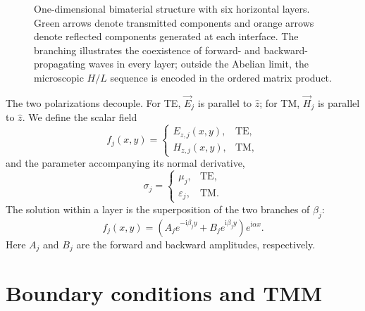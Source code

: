 \documentclass[10pt,a4paper]{article}
\newcommand{\ii}{\mathrm{i}}
\newcommand{\vE}{\vec{E}}
\newcommand{\vH}{\vec{H}}
\begin{document}
\begin{figure}[t]
\caption{One-dimensional bimaterial structure with six horizontal layers. Green arrows denote transmitted components and orange arrows denote reflected components generated at each interface. The branching illustrates the coexistence of forward- and backward-propagating waves in every layer; outside the Abelian limit, the microscopic $H/L$ sequence is encoded in the ordered matrix product.}
\label{fig:stack-hl}
\end{figure}

The two polarizations decouple. For TE, $\vE_j$ is parallel to $\hat z$; for TM, $\vH_j$ is parallel to $\hat z$. We define the scalar field
\begin{equation}
f_j(x,y)=
\begin{cases}
E_{z,j}(x,y),&\mathrm{TE},\\
H_{z,j}(x,y),&\mathrm{TM},
\end{cases}
\end{equation}
and the parameter accompanying its normal derivative,
\begin{equation}
\sigma_j=
\begin{cases}
\mu_j,&\mathrm{TE},\\
\varepsilon_j,&\mathrm{TM}.
\end{cases}
\label{eq:sigma}
\end{equation}
The solution within a layer is the superposition of the two branches of $\beta_j$:
\begin{equation}
f_j(x,y)=
\left(A_j e^{-\ii\beta_j y}+B_j e^{\ii\beta_j y}\right)e^{\ii\alpha x}.
\label{eq:onda-capa}
\end{equation}
Here $A_j$ and $B_j$ are the forward and backward amplitudes, respectively.

\section{Boundary conditions and TMM}
\end{document}
